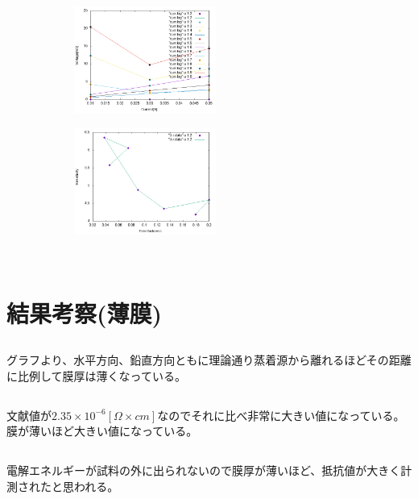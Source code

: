 \documentclass{jsarticle}
\begin{document}
\begin{figure}[htbp]
 \begin{minipage}{0.5\hsize}
  \begin{center}
   \includegraphics[width=70mm,height=35mm]{pictures/curr-volt.png}
  \end{center}
  \label{fig:one}
 \end{minipage}
 \begin{minipage}{0.5\hsize}
  \begin{center}
   \includegraphics[width=70mm,height=35mm]{pictures/d-r.png}
  \end{center}
  \label{fig:two}
 \end{minipage}
\end{figure}
\\
\section{結果考察(薄膜)}
\subsection{}
グラフより、水平方向、鉛直方向ともに理論通り蒸着源から離れるほどその距離に比例して膜厚は薄くなっている。
\subsection{}
文献値が$2.35\times10^{-6}[\Omega\times cm]$なのでそれに比べ非常に大きい値になっている。膜が薄いほど大きい値になっている。
\subsection{}
電解エネルギーが試料の外に出られないので膜厚が薄いほど、抵抗値が大きく計測されたと思われる。
\end{document}
